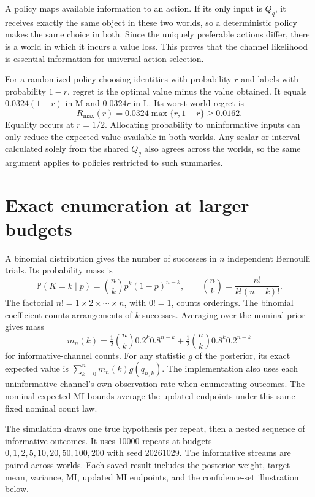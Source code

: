 \documentclass[11pt,a4paper]{report}
\newcommand{\Prob}{\mathbb P}
\begin{document}
A policy maps available information to an action. If its only input is $Q_q$, it receives exactly the same object in these two worlds, so a deterministic policy makes the same choice in both. Since the uniquely preferable actions differ, there is a world in which it incurs a value loss. This proves that the channel likelihood is essential information for universal action selection.

For a randomized policy choosing identities with probability $r$ and labels with probability $1-r$, regret is the optimal value minus the value obtained. It equals $0.0324(1-r)$ in M and $0.0324r$ in L. Its worst-world regret is
\begin{equation}
R_{\max}(r)=0.0324\max\{r,1-r\}\geq0.0162.
\end{equation}
Equality occurs at $r=1/2$. Allocating probability to uninformative inputs can only reduce the expected value available in both worlds. Any scalar or interval calculated solely from the shared $Q_q$ also agrees across the worlds, so the same argument applies to policies restricted to such summaries.

\section{Exact enumeration at larger budgets}
A binomial distribution gives the number of successes in $n$ independent Bernoulli trials. Its probability mass is
\begin{equation}
\Prob(K=k\mid p)=\binom nkp^k(1-p)^{n-k},\qquad
\binom nk=\frac{n!}{k!(n-k)!}.
\end{equation}
The factorial $n!=1\times2\times\cdots\times n$, with $0!=1$, counts orderings. The binomial coefficient counts arrangements of $k$ successes. Averaging over the nominal prior gives mass
\begin{equation}
m_n(k)=\tfrac12\binom nk0.2^k0.8^{n-k}
+\tfrac12\binom nk0.8^k0.2^{n-k}
\end{equation}
for informative-channel counts. For any statistic $g$ of the posterior, its exact expected value is $\sum_{k=0}^nm_n(k)g(q_{n,k})$. The implementation also uses each uninformative channel's own observation rate when enumerating outcomes. The nominal expected MI bounds average the updated endpoints under this same fixed nominal count law.

The simulation draws one true hypothesis per repeat, then a nested sequence of informative outcomes. It uses 10000 repeats at budgets $0,1,2,5,10,20,50,100,200$ with seed 20261029. The informative streams are paired across worlds. Each saved result includes the posterior weight, target mean, variance, MI, updated MI endpoints, and the confidence-set illustration below.
\end{document}
